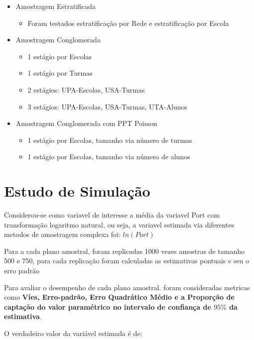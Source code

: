 \documentclass[sn-basic,pdflatex]{sn-jnl}
\theoremstyle{remark}
\theoremstyle{definition}
\providecommand{\tightlist}{%
  \setlength{\itemsep}{0pt}\setlength{\parskip}{0pt}}
\begin{document}
\begin{itemize}
\item
  Amostragem Estratificada

  \begin{itemize}
  \tightlist
  \item
    Foram testados estratificação por Rede e estratificação por Escola
  \end{itemize}
\item
  Amostragem Conglomerada

  \begin{itemize}
  \item
    1 estágio por Escolas
  \item
    1 estágio por Turmas
  \item
    2 estágios: UPA-Escolas, USA-Turmas
  \item
    3 estágios: UPA-Escolas, USA-Turmas, UTA-Alunos
  \end{itemize}
\item
  Amostragem Conglomerada com PPT Poisson

  \begin{itemize}
  \tightlist
  \item
    1 estágio por Escolas, tamanho via número de turmas
  \item
    1 estágio por Escolas, tamanho via número de alunos
  \end{itemize}
\end{itemize}

\hypertarget{estudo-de-simulauxe7uxe3o}{%
\section{Estudo de Simulação}\label{estudo-de-simulauxe7uxe3o}}

Considerou-se como variavel de interesse a média da variavel Port com
transformação logaritmo natural, ou seja, a variavel estimada via
diferentes metodos de amostragem complexa foi: \(ln({Port})\)

Para a cada plano amostral, foram replicadas 1000 vezes amostras de
tamanho 500 e 750, para cada replicação foram calculadas as estimativas
pontuais e seu o erro padrão

Para avaliar o desempenho de cada plano amostral. foram consideradas
metricas como \textbf{Víes, Erro-padrão, Erro Quadrático Médio e a
Proporção de captação do valor paramétrico no intervalo de confiança de
\(95\%\) da estimativa}.

O verdadeiro valor da variável estimada é de:
\end{document}
